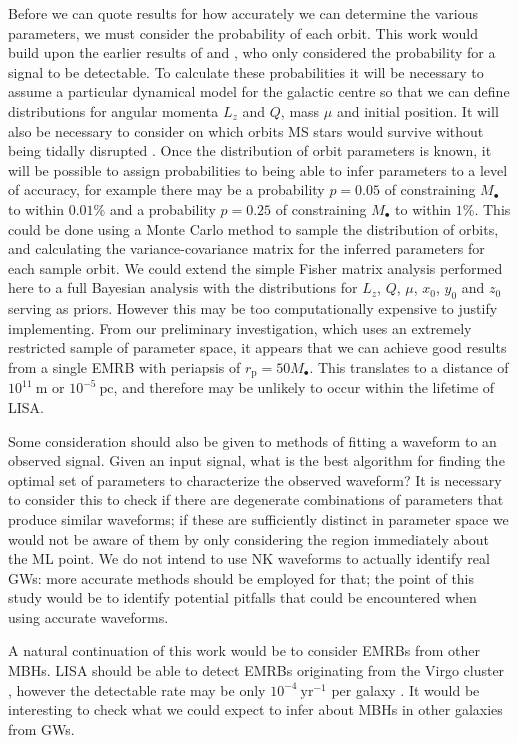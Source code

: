 \documentclass[useAMS,usedcolumn,usegraphicx,usenatbib]{mn2e}
\newcommand{\units}[1]{\ensuremath{~\mathrm{#1}}}
\newcommand{\sub}[1]{\ensuremath{_\mathrm{#1}}}
\begin{document}
Before we can quote results for how accurately we can determine the various parameters, we must consider the probability of each orbit. This work would build upon the earlier results of \citet{Rubbo2006} and \citet{Hopman2007}, who only considered the probability for a signal to be detectable. To calculate these probabilities it will be necessary to assume a particular dynamical model for the galactic centre so that we can define distributions for angular momenta $L_z$ and $Q$, mass $\mu$ and initial position. It will also be necessary to consider on which orbits MS stars would survive without being tidally disrupted \citep{Kobayashi2004}. Once the distribution of orbit parameters is known, it will be possible to assign probabilities to being able to infer parameters to a level of accuracy, for example there may be a probability $p = 0.05$ of constraining $M_\bullet$ to within $0.01\%$ and a probability $p = 0.25$ of constraining $M_\bullet$ to within $1\%$. This could be done using a Monte Carlo method to sample the distribution of orbits, and calculating the variance-covariance matrix for the inferred parameters for each sample orbit. We could extend the simple Fisher matrix analysis performed here to a full Bayesian analysis with the distributions for $L_z$, $Q$, $\mu$, $x_0$, $y_0$ and $z_0$ serving as priors. However this may be too computationally expensive to justify implementing. From our preliminary investigation, which uses an extremely restricted sample of parameter space, it appears that we can achieve good results from a single EMRB with periapsis of $r\sub{p} = 50 M_\bullet$. This translates to a distance of $10^{11}\units{m}$ or $10^{-5}\units{pc}$, and therefore may be unlikely to occur within the lifetime of LISA.

Some consideration should also be given to methods of fitting a waveform to an observed signal. Given an input signal, what is the best algorithm for finding the optimal set of parameters to characterize the observed waveform? It is necessary to consider this to check if there are degenerate combinations of parameters that produce similar waveforms; if these are sufficiently distinct in parameter space we would not be aware of them by only considering the region immediately about the ML point. We do not intend to use NK waveforms to actually identify real GWs: more accurate methods should be employed for that; the point of this study would be to identify potential pitfalls that could be encountered when using accurate waveforms.

A natural continuation of this work would be to consider EMRBs from other MBHs. LISA should be able to detect EMRBs originating from the Virgo cluster \citep{Rubbo2006}, however the detectable rate may be only $10^{-4}\units{yr^{-1}}$ per galaxy \citep{Hopman2007}. It would be interesting to check what we could expect to infer about MBHs in other galaxies from GWs.
\end{document}
